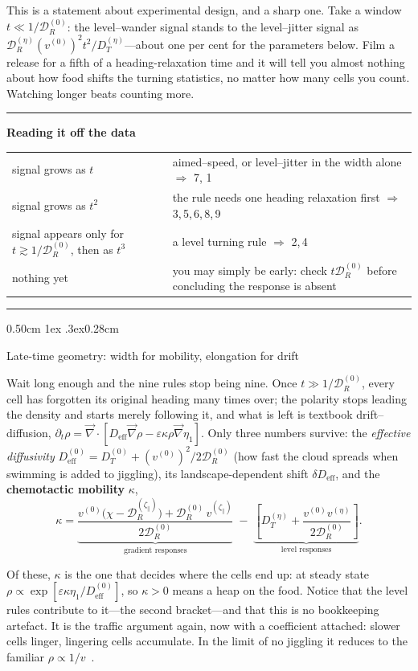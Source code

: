 \documentclass[
  reprint,
  superscriptaddress,
  amsmath,
  amssymb,
  aps,
  pre,
  nofootinbib,
  floatfix
]{revtex4-2}
\makeatletter
\newcommand{\grad}{\vec{\nabla}}
\newcommand{\DR}{\mathcal D_R^{(0)}}
\newcommand{\zp}{\zeta_\parallel}
\newenvironment{readout}
  {\par\addvspace{1.2ex}\noindent\rule{\columnwidth}{0.6pt}\par\nobreak
   \vspace{0.3ex}\noindent\textbf{Reading it off the data}\par\nobreak
   \vspace{0.4ex}\footnotesize\noindent
   \setlength{\parindent}{0pt}%
   \setlength{\emergencystretch}{3em}%
   \let\readout@restore\@arrayparboxrestore
   \def\@arrayparboxrestore{\readout@restore\raggedright\let\\\tabularnewline}%
   \begin{tabular}{@{}p{0.42\columnwidth}@{\hspace{0.9em}}p{0.50\columnwidth}@{}}}
  {\end{tabular}\par\nobreak\vspace{0.4ex}%
   \noindent\rule{\columnwidth}{0.6pt}\par\addvspace{1.0ex}}
\def\section{\@startsection{section}{1}{\z@}%
  {0.50cm \@plus1ex \@minus.3ex}{0.28cm}%
  {\normalfont\small\bfseries\raggedright}}%
\makeatother
\begin{document}
This is a statement about experimental design, and a sharp one.  Take a window
$t \ll 1/\DR$: the level--wander signal stands to the level--jitter signal as
$\mathcal D_R^{(\eta)}(v^{(0)})^{2}t^{2}/D_T^{(\eta)}$---about one per cent
for the parameters below.  Film a release for a fifth of a heading-relaxation
time and it will tell you almost nothing about how food shifts the turning
statistics, no matter how many cells you count.  Watching longer beats
counting more.

\begin{readout}
signal grows as $t$ & aimed--speed, or level--jitter in the width alone
$\Rightarrow$ 7, 1\\[2pt]
signal grows as $t^{2}$ & the rule needs one heading relaxation first
$\Rightarrow$ 3,\,5,\,6,\,8,\,9\\[2pt]
signal appears only for $t\gtrsim1/\DR$, then as $t^{3}$ & a level turning rule
$\Rightarrow$ 2,\,4\\[2pt]
nothing yet & you may simply be early: check $t\DR$ before concluding the
response is absent\\
\end{readout}

\section{Late-time geometry: width for mobility, elongation for drift}
\label{sec:long-time}

Wait long enough and the nine rules stop being nine.  Once $t\gg1/\DR$, every
cell has forgotten its original heading many times over; the polarity stops
leading the density and starts merely following it, and what is left is
textbook drift--diffusion,
$\partial_t\rho=\grad\cdot[D_{\mathrm{eff}}\grad\rho-\varepsilon\kappa\rho\grad\eta_1]$.
Only three numbers survive: the \emph{effective diffusivity}
$D_{\mathrm{eff}}^{(0)}=D_T^{(0)}+(v^{(0)})^{2}/2\DR$ (how fast the cloud
spreads when swimming is added to jiggling), its landscape-dependent shift
$\delta D_{\mathrm{eff}}$, and the \textbf{chemotactic mobility} $\kappa$,
\begin{equation}
 \kappa = \underbrace{\frac{v^{(0)}\bigl(\chi - \mathcal D_R^{(\zp)}\bigr)+\DR\,v^{(\zp)}}{2\DR}}_{\text{gradient responses}}
 \;-\;\underbrace{\left[D_T^{(\eta)}+\frac{v^{(0)}v^{(\eta)}}{2\DR}\right]}_{\text{level responses}} .
 \label{eq:drift-mobility}
\end{equation}

Of these, $\kappa$ is the one that decides where the cells end up: at steady
state $\rho\propto\exp[\varepsilon\kappa\eta_1/D_{\mathrm{eff}}^{(0)}]$, so
$\kappa>0$ means a heap on the food.  Notice that the level rules contribute
to it---the second bracket---and that this is no bookkeeping artefact.  It is
the traffic argument again, now with a coefficient attached: slower cells
linger, lingering cells accumulate.  In the limit of no jiggling it reduces to
the familiar $\rho\propto1/v$~\cite{schnitzer1993,tailleur2008}.
\end{document}
